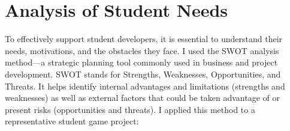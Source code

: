 \section{Analysis of Student Needs}
To effectively support student developers, it is essential to understand their needs, motivations, and the obstacles they face. I used the SWOT analysis method—a strategic planning tool commonly used in business and project development. SWOT stands for Strengths, Weaknesses, Opportunities, and Threats. It helps identify internal advantages and limitations (strengths and weaknesses) as well as external factors that could be taken advantage of or present risks (opportunities and threats)\cite{investopedia-swot}. I applied this method to a representative student game project:

